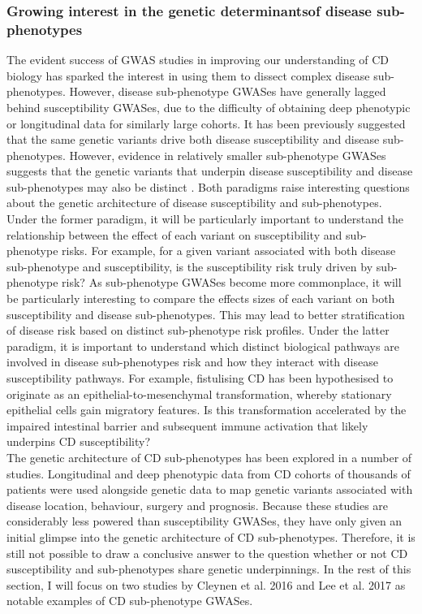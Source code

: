\subsubsection{Growing interest in the genetic determinantsof disease sub-phenotypes}
The evident success of GWAS studies in improving our understanding of CD biology has sparked the interest in using them to dissect complex disease sub-phenotypes. However, disease sub-phenotype GWASes have generally lagged behind susceptibility GWASes, due to the difficulty of obtaining deep phenotypic or longitudinal data for similarly large cohorts. It has been previously suggested that the same genetic variants drive both disease susceptibility and disease sub-phenotypes. However, evidence in relatively smaller sub-phenotype GWASes suggests that the genetic variants that underpin disease susceptibility and disease sub-phenotypes may also be distinct \cite{Iwaki2019-mf,Severe_Covid-19_GWAS_Group2020-rn}. Both paradigms raise interesting questions about the genetic architecture of disease susceptibility and sub-phenotypes. Under the former paradigm, it will be particularly important to understand the relationship between the effect of each variant on susceptibility and sub-phenotype risks. For example, for a given variant associated with both disease sub-phenotype and susceptibility, is the susceptibility risk truly driven by sub-phenotype risk? As sub-phenotype GWASes become more commonplace, it will be particularly interesting to compare the effects sizes of each variant on both susceptibility and disease sub-phenotypes. This may lead to better stratification of disease risk based on distinct sub-phenotype risk profiles. Under the latter paradigm, it is important to understand which distinct biological pathways are involved in disease sub-phenotypes risk and how they interact with disease susceptibility pathways. For example, fistulising CD has been hypothesised to originate as an epithelial-to-mesenchymal transformation, whereby stationary epithelial cells gain migratory features. Is this transformation accelerated by the impaired intestinal barrier and subsequent immune activation that likely underpins CD susceptibility?\\

The genetic architecture of CD sub-phenotypes has been explored in a number of studies. Longitudinal and deep phenotypic data from CD cohorts of thousands of patients were used alongside genetic data to map genetic variants associated with disease location, behaviour, surgery and prognosis. Because these studies are considerably less powered than susceptibility GWASes, they have only given an initial glimpse into the genetic architecture of CD sub-phenotypes. Therefore, it is still not possible to draw a conclusive answer to the question whether or not CD susceptibility and sub-phenotypes share genetic underpinnings. In the rest of this section, I will focus on two studies by Cleynen et al. 2016 \cite{Cleynen2016-ha} and Lee et al. 2017 \cite{Lee2017-tl} as notable examples of CD sub-phenotype GWASes. \\

